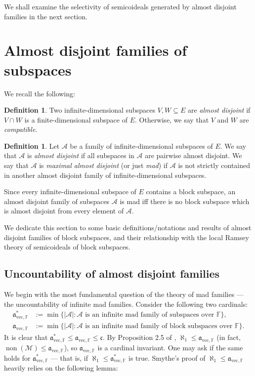 \documentclass[11pt,reqno]{amsart}
\theoremstyle{plain}
\numberwithin{equation}{section}
\theoremstyle{definition}
\newtheorem{definition}[theorem]{Definition}
\newcommand{\func}{\operatorname}
\newcommand{\cal}{\mathcal}
\renewcommand{\frak}{\mathfrak}
\newcommand{\A}{\cal{A}}
\newcommand{\non}{\func{non}}
\newcommand{\M}{\mathcal{M}}
\newcommand{\avec}{\frak{a}_{\mathrm{vec},\mathbb{F}}}
\begin{document}
We shall examine the selectivity of semicoideals generated by almost disjoint families in the next section.

\section{Almost disjoint families of subspaces}
\label{sec:ad.families}
We recall the following:
\begin{definition}
    Two infinite-dimensional subspaces $V,W \subseteq E$ are \emph{almost disjoint} if $V \cap W$ is a finite-dimensional subspace of $E$. Otherwise, we say that $V$ and $W$ are \emph{compatible}.
\end{definition}

\begin{definition}    
    Let $\A$ be a family of infinite-dimensional subspaces of $E$. We say that $\A$ is \emph{almost disjoint} if all subspaces in $\A$ are pairwise almost disjoint. We say that $\A$ is \emph{maximal almost disjoint} (or just \emph{mad}) if $\A$ is not strictly contained in another almost disjoint family of infinite-dimensional subspaces.
\end{definition}

Since every infinite-dimensional subspace of $E$ contains a block subspace, an almost disjoint family of subspaces $\A$ is mad iff there is no block subspace which is almost disjoint from every element of $\A$.

We dedicate this section to some basic definitions/notations and results of almost disjoint families of block subspaces, and their relationship with the local Ramsey theory of semicoideals of block subspaces.

\subsection{Uncountability of almost disjoint families}
We begin with the most fundamental question of the theory of mad families --- the uncountability of infinite mad families. Consider the following two cardinals:
\begin{align*}
    \avec^* &:= \min\{|\A| : \text{$\A$ is an infinite mad family of subspaces over $\mathbb{F}$}\}, \\
    \avec &:= \min\{|\A| : \text{$\A$ is an infinite mad family of block subspaces over $\mathbb{F}$}\}.
\end{align*}
It is clear that $\avec^* \leq \avec \leq \frak{c}$. By Proposition 2.5 of \cite{S19}, $\aleph_1 \leq \avec$ (in fact, $\non(\M) \leq \avec$), so $\avec$ is a cardinal invariant. One may ask if the same holds for $\avec^*$ --- that is, if $\aleph_1 \leq \avec^*$ is true. Smythe's proof of $\aleph_1 \leq \avec$ heavily relies on the following lemma:
\end{document}
